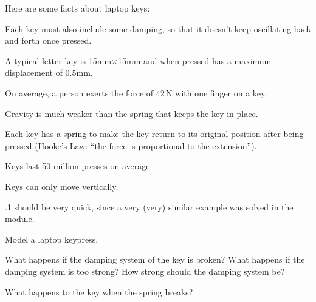 \question
	Here are some facts about laptop keys:

\begin{itemize}
\begin{minipage}{.4\textwidth}
\item[\color{Gray}(da)] Each key must also include some damping, so that it doesn't keep oscillating back and forth once pressed.

\item[\color{Gray}(di)] A typical letter key is 15mm$\times$15mm and when pressed has a maximum displacement of 0.5mm.

\item[\color{Gray}(fo)] On average, a person exerts the force of $42\,$N with one finger on a key.
\end{minipage}
\hfill
\begin{minipage}{.4\textwidth}
\item[\color{Gray}(gr)] Gravity is much weaker than the spring that keeps the key in place.

\item[\color{Gray}(hl)] Each key has a spring to make the key return to its original position after being pressed (Hooke's Law: ``the force is proportional to the extension'').

\item[\color{Gray}(lo)] Keys last 50 million presses on average.

\item[\color{Gray}(ve)] Keys can only move vertically.
\end{minipage}
\end{itemize}
	
\begin{annotation}
	\begin{goals}
		.1 should be very quick, since a very (very) similar example was solved in the module.
	\end{goals}
\end{annotation}
\begin{parts}
	\item Model a laptop keypress.
	\item What happens if the damping system of the key is broken? What happens if the damping system is too strong? How strong should the damping system be?
	\item What happens to the key when the spring breaks?
\end{parts}





